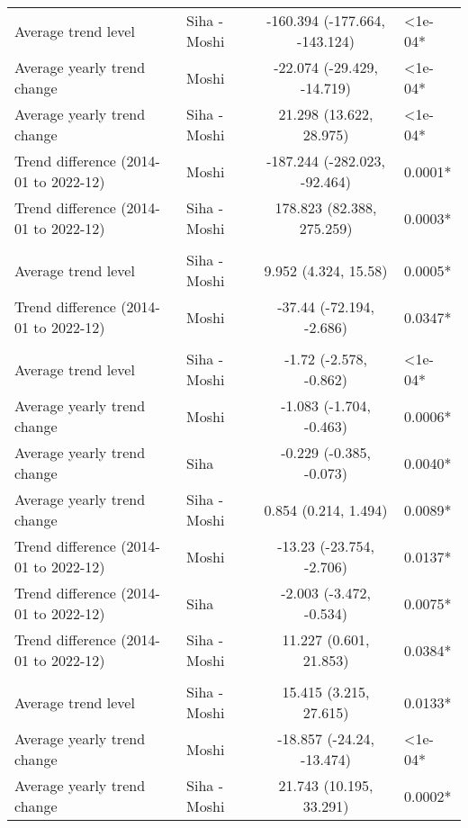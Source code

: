 \begin{longtable}{l|lcl}
\midrule\addlinespace[2.5pt]
\multicolumn{4}{l}{Psychoses} \\ 
\midrule\addlinespace[2.5pt]
Average trend level & Siha - Moshi & -160.394 (-177.664, -143.124) & <1e-04* \\ 
Average yearly trend change & Moshi & -22.074 (-29.429, -14.719) & <1e-04* \\ 
Average yearly trend change & Siha - Moshi & 21.298 (13.622, 28.975) & <1e-04* \\ 
Trend difference (2014-01 to 2022-12) & Moshi & -187.244 (-282.023, -92.464) & 0.0001* \\ 
Trend difference (2014-01 to 2022-12) & Siha - Moshi & 178.823 (82.388, 275.259) & 0.0003* \\ 
\midrule\addlinespace[2.5pt]
\multicolumn{4}{l}{Road Traffic Accidents} \\ 
\midrule\addlinespace[2.5pt]
Average trend level & Siha - Moshi & 9.952 (4.324, 15.58) & 0.0005* \\ 
Trend difference (2014-01 to 2022-12) & Moshi & -37.44 (-72.194, -2.686) & 0.0347* \\ 
\midrule\addlinespace[2.5pt]
\multicolumn{4}{l}{Schistosomiasis} \\ 
\midrule\addlinespace[2.5pt]
Average trend level & Siha - Moshi & -1.72 (-2.578, -0.862) & <1e-04* \\ 
Average yearly trend change & Moshi & -1.083 (-1.704, -0.463) & 0.0006* \\ 
Average yearly trend change & Siha & -0.229 (-0.385, -0.073) & 0.0040* \\ 
Average yearly trend change & Siha - Moshi & 0.854 (0.214, 1.494) & 0.0089* \\ 
Trend difference (2014-01 to 2022-12) & Moshi & -13.23 (-23.754, -2.706) & 0.0137* \\ 
Trend difference (2014-01 to 2022-12) & Siha & -2.003 (-3.472, -0.534) & 0.0075* \\ 
Trend difference (2014-01 to 2022-12) & Siha - Moshi & 11.227 (0.601, 21.853) & 0.0384* \\ 
\midrule\addlinespace[2.5pt]
\multicolumn{4}{l}{Skin Infection - Fungal} \\ 
\midrule\addlinespace[2.5pt]
Average trend level & Siha - Moshi & 15.415 (3.215, 27.615) & 0.0133* \\ 
Average yearly trend change & Moshi & -18.857 (-24.24, -13.474) & <1e-04* \\ 
Average yearly trend change & Siha - Moshi & 21.743 (10.195, 33.291) & 0.0002* \\ 

\end{longtable}
